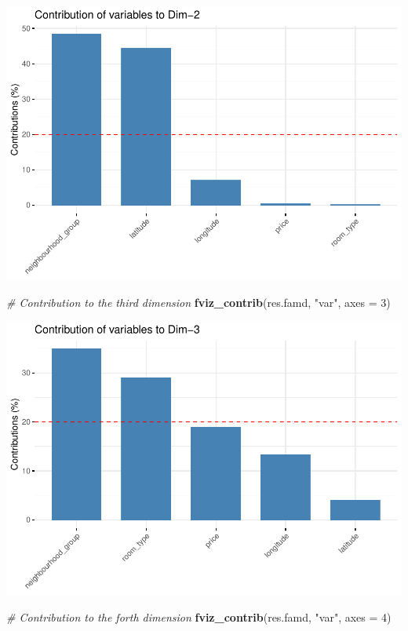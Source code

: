 \documentclass[
]{article}
\newenvironment{Shaded}{\begin{snugshade}}{\end{snugshade}}
\newcommand{\CommentTok}[1]{\textcolor[rgb]{0.56,0.35,0.01}{\textit{#1}}}
\newcommand{\DataTypeTok}[1]{\textcolor[rgb]{0.13,0.29,0.53}{#1}}
\newcommand{\DecValTok}[1]{\textcolor[rgb]{0.00,0.00,0.81}{#1}}
\newcommand{\KeywordTok}[1]{\textcolor[rgb]{0.13,0.29,0.53}{\textbf{#1}}}
\newcommand{\NormalTok}[1]{#1}
\newcommand{\StringTok}[1]{\textcolor[rgb]{0.31,0.60,0.02}{#1}}
\begin{document}
\includegraphics{project-code_files/figure-latex/unnamed-chunk-39-3.pdf}

\begin{Shaded}
\begin{Highlighting}[]
\CommentTok{# Contribution to the third dimension}
\KeywordTok{fviz_contrib}\NormalTok{(res.famd, }\StringTok{"var"}\NormalTok{, }\DataTypeTok{axes =} \DecValTok{3}\NormalTok{)}
\end{Highlighting}
\end{Shaded}

\includegraphics{project-code_files/figure-latex/unnamed-chunk-39-4.pdf}

\begin{Shaded}
\begin{Highlighting}[]
\CommentTok{# Contribution to the forth dimension}
\KeywordTok{fviz_contrib}\NormalTok{(res.famd, }\StringTok{"var"}\NormalTok{, }\DataTypeTok{axes =} \DecValTok{4}\NormalTok{)}
\end{Highlighting}
\end{Shaded}
\end{document}
